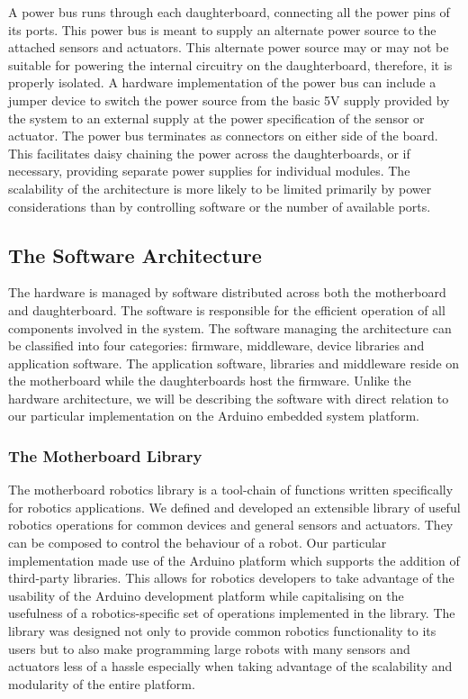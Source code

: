 A power bus runs through each daughterboard, connecting all the power pins of its ports. This power bus is meant to supply an alternate power source to the attached sensors and actuators. This alternate power source may or may not be suitable for powering the internal circuitry on the daughterboard, therefore, it is properly isolated. A hardware implementation of the power bus can include a jumper device to switch the power source from the basic 5V supply provided by the system to an external supply at the power specification of the sensor or actuator. The power bus terminates as connectors on either side of the board. This facilitates daisy chaining the power across the daughterboards, or if necessary, providing separate power supplies for individual modules. The scalability of the \xten architecture is more likely to be limited primarily by power considerations than by controlling software or the number of available ports.
\newpage

\subsection{The Software Architecture} %
\label{sub:the_software_architecture}
The \xten hardware is managed by software distributed across both the motherboard and daughterboard. The software is responsible for the efficient operation of all components involved in the system. The software managing the architecture can be classified into four categories: firmware, middleware, device libraries and application software. The application software, libraries and middleware reside on the motherboard while the daughterboards host the firmware. Unlike the hardware architecture, we will be describing the software with direct relation to our particular implementation on the Arduino embedded system platform.
	

	\subsubsection{The Motherboard Library} %
	\label{ssub:the_motherboard_library}

	
	The motherboard robotics library is a tool-chain of functions written specifically for robotics applications. We defined and developed an extensible library of useful robotics operations for common devices and general sensors and actuators. They can be composed to control the behaviour of a robot. Our particular implementation made use of the Arduino platform which supports the addition of third-party libraries. This allows for robotics developers to take advantage of the usability of the Arduino development platform while capitalising on the usefulness of a robotics-specific set of operations implemented in the library.
The library was designed not only to provide common robotics functionality to its users but to also make programming large robots with many sensors and actuators less of a hassle especially when taking advantage of the scalability and modularity of the entire platform.

